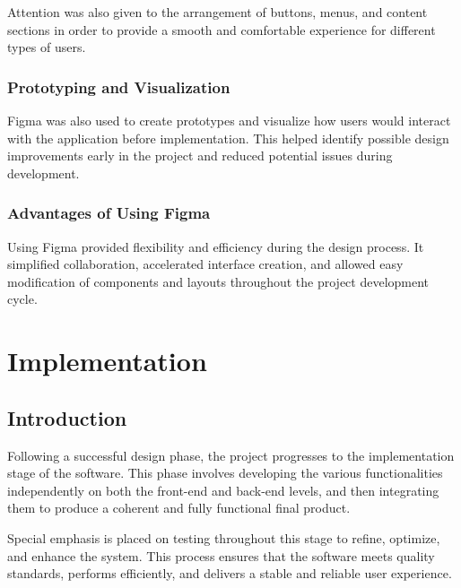 \documentclass[12pt]{article}
\begin{document}
Attention was also given to the arrangement of buttons, menus, and content sections in order to provide a smooth and comfortable experience for different types of users.
\subsubsection{Prototyping and Visualization}
Figma was also used to create prototypes and visualize how users would interact with the application before implementation. This helped identify possible design improvements early in the project and reduced potential issues during development.
\subsubsection{Advantages of Using Figma}
Using Figma provided flexibility and efficiency during the design process. It simplified collaboration, accelerated interface creation, and allowed easy modification of components and layouts throughout the project development cycle.

\newpage

\section{Implementation}
\subsection{Introduction}
Following a successful design phase, the project progresses to the implementation stage of the software. This phase involves developing the various functionalities independently on both the front-end and back-end levels, and then integrating them to produce a coherent and fully functional final product.

Special emphasis is placed on testing throughout this stage to refine, optimize, and enhance the system. This process ensures that the software meets quality standards, performs efficiently, and delivers a stable and reliable user experience.
\end{document}
